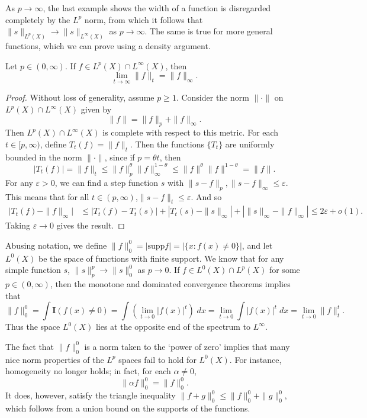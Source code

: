 As $p \to \infty$, the last example shows the width of a function is disregarded completely by the $L^p$ norm, from which it follows that $\| s \|_{L^p(X)} \to \| s \|_{L^\infty(X)}$ as $p \to \infty$. The same is true for more general functions, which we can prove using a density argument.

\begin{theorem}
    Let $p \in (0,\infty)$. If $f \in L^p(X) \cap L^\infty(X)$, then
    \[ \lim_{t \to \infty} \| f \|_t = \| f \|_\infty. \]
\end{theorem}
\begin{proof}
    Without loss of generality, assume $p \geq 1$. Consider the norm $\| \cdot \|$ on $L^p(X) \cap L^\infty(X)$ given by
    \[ \| f \| = \| f \|_p + \| f \|_\infty. \]
    Then $L^p(X) \cap L^\infty(X)$ is complete with respect to this metric. For each $t \in [p,\infty)$, define $T_t(f) = \| f \|_t$. Then the functions $\{ T_t \}$ are uniformly bounded in the norm $\| \cdot \|$, since if $p = \theta t$, then
    \[ |T_t(f)| = \| f \|_t \leq \| f \|_p^\theta \| f \|_\infty^{1-\theta} \leq \| f \|^\theta \| f \|^{1-\theta} = \| f \|. \]
    For any $\varepsilon > 0$, we can find a step function $s$ with $\| s - f \|_p, \| s - f \|_\infty \leq \varepsilon$. This means that for all $t \in (p,\infty)$,$\| s - f \|_t \leq \varepsilon$. And so
    \begin{align*}
        \Big| T_t(f) - \| f \|_\infty \Big| &\leq |T_t(f) - T_t(s)| + |T_t(s) - \| s \|_\infty| + |\| s \|_\infty - \| f \|_\infty| \leq 2\varepsilon + o(1).
    \end{align*}
    Taking $\varepsilon \to 0$ gives the result.
\end{proof}

Abusing notation, we define $\| f \|_0^0 = | \text{supp} f | = | \{ x: f(x) \neq 0 \} |$, and let $L^0(X)$ be the space of functions with finite support. We know that for any simple function $s$, $\| s \|_p^p \to \| s \|_0^0$ as $p \to 0$. If $f \in L^0(X) \cap L^p(X)$ for some $p \in (0,\infty)$, then the monotone and dominated convergence theorems implies that
%
\[ \| f \|_0^0 = \int \mathbf{I}(f(x) \neq 0) = \int \left( \lim_{t \to 0} |f(x)|^t \right)\; dx = \lim_{t \to 0} \int |f(x)|^t\; dx = \lim_{t \to 0} \| f \|_t^t. \]
%
Thus the space $L^0(X)$ lies at the opposite end of the spectrum to $L^\infty$.

The fact that $\| f \|_0^0$ is a norm taken to the `power of zero' implies that many nice norm properties of the $L^p$ spaces fail to hold for $L^0(X)$. For instance, homogeneity no longer holds; in fact, for each $\alpha \neq 0$,
%
\[ \| \alpha f \|_0^0 = \| f \|_0^0. \]
%
It does, however, satisfy the triangle inequality $\| f + g \|_0^0 \leq \| f \|_0^0 + \| g \|_0^0$, which follows from a union bound on the supports of the functions.

